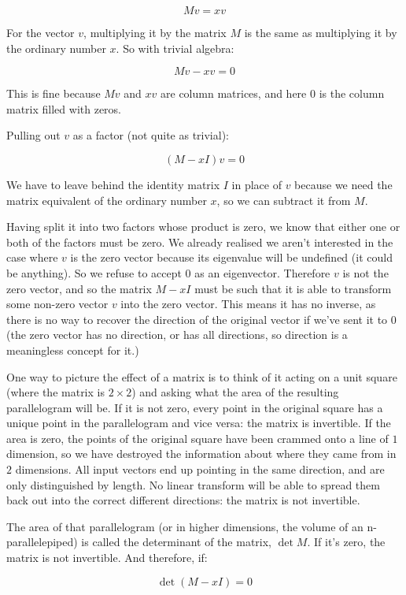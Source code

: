 $$Mv = xv$$

For the vector $v$, multiplying it by the matrix $M$ is the same as multiplying it by the ordinary number $x$. So with trivial algebra:

$$Mv - xv = 0$$

This is fine because $Mv$ and $xv$ are column matrices, and here $0$ is the column matrix filled with zeros.

Pulling out $v$ as a factor (not quite as trivial):

$$(M - xI)v = 0$$

We have to leave behind the identity matrix $I$ in place of $v$ because we need the matrix equivalent of the ordinary number $x$, so we can subtract it from $M$.

Having split it into two factors whose product is zero, we know that either one or both of the factors must be zero. We already realised we aren't interested in the case where $v$ is the zero vector because its eigenvalue will be undefined (it could be anything). So we refuse to accept $0$ as an eigenvector. Therefore $v$ is not the zero vector, and so the matrix $M - xI$ must be such that it is able to transform some non-zero vector $v$ into the zero vector. This means it has no inverse, as there is no way to recover the direction of the original vector if we've sent it to $0$ (the zero vector has no direction, or has all directions, so direction is a meaningless concept for it.)

One way to picture the effect of a matrix is to think of it acting on a unit square (where the matrix is $2 \times 2$) and asking what the area of the resulting parallelogram will be. If it is not zero, every point in the original square has a unique point in the parallelogram and vice versa: the matrix is invertible. If the area is zero, the points of the original square have been crammed onto a line of $1$ dimension, so we have destroyed the information about where they came from in $2$ dimensions. All input vectors end up pointing in the same direction, and are only distinguished by length. No linear transform will be able to spread them back out into the correct different directions: the matrix is not invertible.

The area of that parallelogram (or in higher dimensions, the volume of an n-parallelepiped) is called the determinant of the matrix, $\det M$. If it's zero, the matrix is not invertible. And therefore, if:

$$\det{(M - xI)} = 0$$

